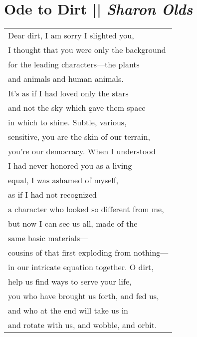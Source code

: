 \section[Ode to Dirt]{Ode to Dirt || \emph{Sharon Olds} \hspace*{\fill}  \thepage}
\vfill
\hspace{0pt}
\begin{center}
\begin{tabular}{l}
Dear dirt, I am sorry I slighted you,\\
I thought that you were only the background\\
for the leading characters—the plants\\
and animals and human animals.\\
It’s as if I had loved only the stars\\
and not the sky which gave them space\\
in which to shine. Subtle, various,\\
sensitive, you are the skin of our terrain,\\
you’re our democracy. When I understood\\
I had never honored you as a living\\
equal, I was ashamed of myself,\\
as if I had not recognized\\
a character who looked so different from me,\\
but now I can see us all, made of the\\
same basic materials—\\
cousins of that first exploding from nothing—\\
in our intricate equation together. O dirt,\\
help us find ways to serve your life,\\
you who have brought us forth, and fed us,\\
and who at the end will take us in\\
and rotate with us, and wobble, and orbit.
\end{tabular}
\end{center}
\hspace{0pt}
\vfill